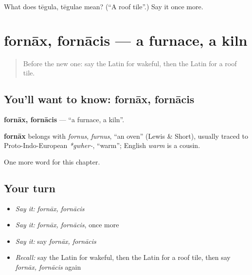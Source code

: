 \begin{tcolorbox}[breakable,colback=teal!4,colframe=teal!35!black,title={Before you move on}]
What does tēgula, tēgulae mean? (\textquotedblleft{}A roof tile\textquotedblright{}.) Say it once more.
\end{tcolorbox}
\section[fornāx, fornācis]{fornāx, fornācis — a furnace, a kiln}

\label{lesson:LA-C217-fornax}



\begin{quote}
Before the new one: say the Latin for wakeful, then the Latin for a roof tile.
\end{quote}

\subsection*{You'll want to know: fornāx, fornācis}
\textbf{fornāx, fornācis} — \textquotedblleft{}a furnace, a kiln\textquotedblright{}.

\begin{cousinweb}
\textbf{fornāx} belongs with \emph{fornus}, \emph{furnus}, \textquotedblleft{}an oven\textquotedblright{} (Lewis \& Short), usually traced to Proto-Indo-European \emph{*gwher-}, \textquotedblleft{}warm\textquotedblright{}; English \emph{warm} is a cousin.
\end{cousinweb}

\begin{grammarlens}[title={What you've built}]
One more word for this chapter.
\end{grammarlens}

\subsection*{Your turn}
\begin{itemize}
\raggedright
  \item \emph{Say it:} \emph{fornāx, fornācis}
  \item \emph{Say it:} \emph{fornāx, fornācis}, once more
  \item \emph{Say it:} say \emph{fornāx, fornācis}
  \item \emph{Recall:} say the Latin for wakeful, then the Latin for a roof tile, then say \emph{fornāx, fornācis} again
\end{itemize}

